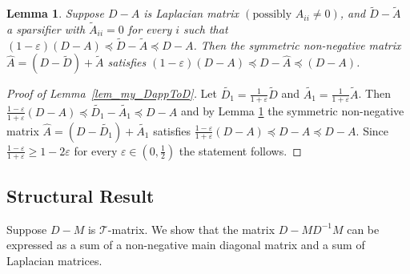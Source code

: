 \documentclass[11pt]{article}
\newcommand{\GL}{\mathcal{T}}
\newcommand{\wD}{\widetilde{D}}
\newcommand{\wA}{\widetilde{A}}
\newcommand{\hA}{\widehat{A}}
\newcommand{\Di}{D^{-1}}
\newcommand{\eps}{\epsilon}
\renewcommand{\geq}{\geqslant}
\renewcommand{\eps}{\varepsilon}
\newtheorem{lem}[thm]{Lemma}
\numberwithin{thm}{section}
\begin{document}
\begin{lem}
\cite{PengPhd13}\label{lem_DA}
Suppose $D-A$ is Laplacian matrix
$(\text{possibly }A_{ii}\neq0)$, and $\wD-\wA$
a sparsifier with $\wA_{ii}=0$ for every $i$ such that
$(1-\eps)(D-A)\preceq\wD-\wA\preceq D-A$.
Then the symmetric non-negative matrix $\hA=(D-\wD)+\wA$
satisfies $(1-\eps)(D-A)\preceq D-\hA\preceq(D-A)$.
\end{lem}


\begin{proof}[Proof of Lemma~\ref{lem_my_DappToD}]
Let $\widetilde{D_{1}}=\frac{1}{1+\eps}\wD$
and $\widetilde{A_{1}}=\frac{1}{1+\eps}\wA$. Then $\frac{1-\eps}{1+\eps}(D-A)\preceq\widetilde{D_{1}}-\widetilde{A_{1}}\preceq D-A$
and by Lemma \ref{lem_DA} the symmetric non-negative matrix $\hA=(D-\widetilde{D_{1}})+\widetilde{A_{1}}$
satisfies $\frac{1-\eps}{1+\eps}(D-A)\preceq D-\hA\preceq D-A.$
Since $\frac{1-\eps}{1+\eps}\geq1-2\eps$ for every $\eps\in(0,\frac{1}{2})$
the statement follows.
\end{proof}





\subsection{Structural Result}\label{appsubsec:SR}

Suppose $D-M$ is $\GL$-matrix. We show that the matrix $D-M\Di M$ can be expressed as a sum of a non-negative main diagonal matrix and a sum of Laplacian matrices.
\end{document}
